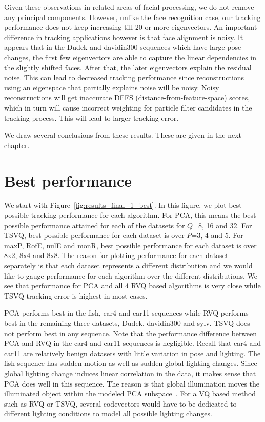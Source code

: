 \begin{Body}
Given these observations in related areas of facial processing, we do not remove any principal components.  However, unlike the face recognition case, our tracking performance does not keep increasing till 20 or more eigenvectors.  An important difference in tracking applications however is that face alignment is noisy.  It appears that in the Dudek and davidin300 sequences which have large pose changes, the first few eigenvectors are able to capture the linear dependencies in the slightly shifted faces.  After that, the later eigenvectors explain the residual noise.  This can lead to decreased tracking performance since reconstructions using an eigenspace that partially explains noise will be noisy.  Noisy reconstructions will get inaccurate DFFS (distance-from-feature-space) scores, which in turn will cause incorrect weighting for particle filter candidates in the tracking process.  This will lead to larger tracking error.



We draw several conclusions from these results.  These are given in the next chapter.


\section{Best performance}


We start with Figure~\ref{fig:results_final_1_best}.  In this figure, we plot best possible tracking performance for each algorithm.  For PCA, this means the best possible performance attained for each of the datasets for $Q$=8, 16 and 32.  For TSVQ, best possible performance for each dataset is over $P$=3, 4 and 5.  For maxP, RofE, nulE and monR, best possible performance for each dataset is over 8x2, 8x4 and 8x8.  The reason for plotting performance for each dataset separately is that each dataset represents a different distribution and we would like to gauge performance for each algorithm over the different distributions.  We see that performance for PCA and all 4 RVQ based algorithms is very close while TSVQ tracking error is highest in most cases.  

PCA performs best in the fish, car4 and car11 sequences while RVQ performs best in the remaining three datasets, Dudek, davidin300 and sylv.  TSVQ does not perform best in any sequence.  Note that the performance difference between PCA and RVQ in the car4 and car11 sequences is negligible.  Recall that car4 and car11 are relatively benign datasets with little variation in pose and lighting.  The fish sequence has sudden motion as well as sudden global lighting changes.   Since global lighting change induces linear correlation in the data, it makes sense that PCA does well in this sequence.  The reason is that global illumination moves the illuminated object within the modeled PCA subspace~\cite{1987_JNL_Faces_Sirovich}.  For a VQ based method such as RVQ or TSVQ, several codevectors would have to be dedicated to different lighting conditions to model all possible lighting changes.  


\end{Body}
